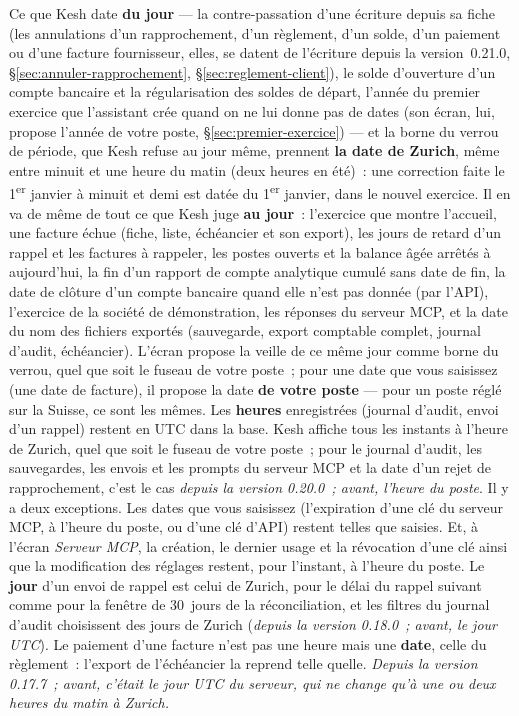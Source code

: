\documentclass[a4paper,11pt,oneside]{article}
\begin{document}
\begin{keshnote}[title={La date du jour est celle de Zurich, même la nuit}]\label{sec:date-du-jour}
Ce que Kesh date \textbf{du jour} --- la contre-passation d'une écriture depuis sa fiche (les
annulations d'un rapprochement, d'un règlement, d'un solde, d'un paiement ou d'une facture
fournisseur, elles, se datent de l'écriture depuis la version~0.21.0,
\S\ref{sec:annuler-rapprochement}, \S\ref{sec:reglement-client}), le solde d'ouverture d'un compte bancaire et
la régularisation des soldes de départ, l'année du premier exercice que l'assistant crée quand
on ne lui donne pas de dates (son écran, lui, propose l'année de votre poste, \S\ref{sec:premier-exercice}) --- et la borne du verrou de période, que Kesh refuse au jour même, prennent \textbf{la
date de Zurich}, même entre minuit et une heure du matin (deux heures en été)~: une correction
faite le 1\textsuperscript{er} janvier à minuit et demi est datée du 1\textsuperscript{er}
janvier, dans le nouvel exercice. Il en va de même de tout ce que Kesh juge \textbf{au jour}~:
l'exercice que montre l'accueil, une facture échue (fiche, liste, échéancier et son export), les
jours de retard d'un rappel et les factures à rappeler, les postes ouverts et la balance âgée
arrêtés à aujourd'hui, la fin d'un rapport de compte analytique cumulé sans date de fin, la date de clôture
d'un compte bancaire quand elle n'est pas donnée (par l'API), l'exercice de la société de
démonstration, les réponses du serveur MCP, et la date du nom des fichiers exportés
(sauvegarde, export comptable complet, journal d'audit, échéancier). L'écran propose la veille
de ce même jour comme borne du verrou, quel que soit le fuseau de votre poste~; pour une date que
vous saisissez (une date de facture), il propose la date \textbf{de votre poste} --- pour un
poste réglé sur la Suisse, ce sont les mêmes. Les \textbf{heures} enregistrées (journal d'audit,
envoi d'un rappel) restent en UTC dans la base. Kesh affiche tous les instants à l'heure de Zurich, quel
que soit le fuseau de votre poste~; pour le journal d'audit, les sauvegardes, les envois et les prompts du
serveur MCP et la date d'un rejet de rapprochement, c'est le cas \emph{depuis la version 0.20.0~; avant,
l'heure du poste}. Il y a deux exceptions. Les dates que vous saisissez (l'expiration d'une clé du
serveur MCP, à l'heure du poste, ou d'une clé d'API) restent telles que saisies. Et, à l'écran
\emph{Serveur MCP}, la création, le dernier usage et la révocation d'une clé ainsi que la modification
des réglages restent, pour l'instant, à l'heure du poste. Le \textbf{jour} d'un envoi de rappel est celui de Zurich, pour
le délai du rappel suivant comme pour la fenêtre de 30~jours de la réconciliation, et les filtres
du journal d'audit choisissent des jours de Zurich (\emph{depuis la version 0.18.0~; avant, le
jour UTC}). Le paiement d'une facture n'est pas une heure mais une
\textbf{date}, celle du règlement~: l'export de l'échéancier la reprend telle quelle.
\emph{Depuis la version 0.17.7~; avant, c'était le jour UTC du serveur, qui ne change
qu'à une ou deux heures du matin à Zurich.}
\end{keshnote}
\end{document}
